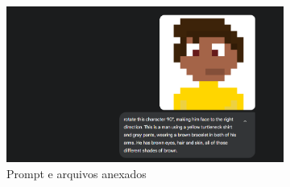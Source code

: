 \begin{figure}[htbp]
    \centering
    \caption{\small Processo da geração 6 do sprite em side view no Gemini Pro em julho/2025}
    \label{fig:geminiPro6}

    \begin{subfigure}{0.8\linewidth}
        \includegraphics[width=1\linewidth]{figs/geminiPro/chat2/tela3.PNG}
        \caption{\small Prompt e arquivos anexados}
        \label{fig:geminiPro6Prompt}
    \end{subfigure}
    \begin{subfigure}{0.23\linewidth}

\end{subfigure}
\end{figure}
